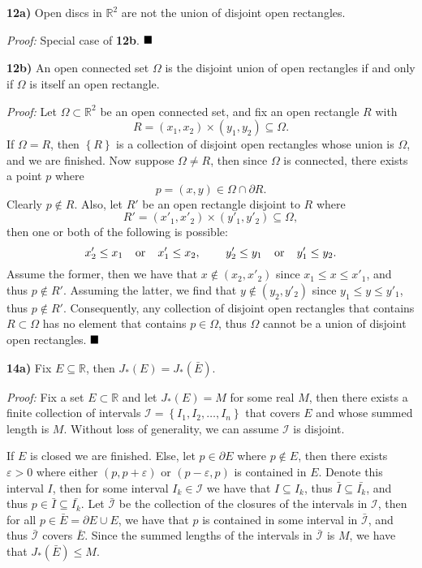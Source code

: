 \documentclass[12pt]{article}
\newcommand{\R}{\ensuremath{\mathbb{R}}}
\newcommand{\e}{\varepsilon}
\newcommand{\braceb}  [1]{\ensuremath{\left\{#1\right\}}}
\newcommand{\mc}[1]{\ensuremath{\mathcal{#1}}}
\newcommand{\done} {\ensuremath{\strut\hfill\blacksquare}}
\newcommand{\proof}{\textit{Proof: }}
\begin{document}
\textbf{12a)} Open discs in \( \R^2 \) are not the union of disjoint open
rectangles.

\proof Special case of \textbf{12b}.
\done

\textbf{12b)} An open connected set \( \Omega \) is the disjoint union of open
rectangles if and only if \( \Omega \) is itself an open rectangle.

\proof
Let \( \Omega \subset \R^2 \) be an open connected set, and fix an open
rectangle \( R \) with
\[
	R = (x_1, x_2) \times (y_1, y_2) \subseteq \Omega.
\]
If \( \Omega = R \), then \( \braceb{R} \) is a collection of disjoint
open rectangles whose union is \( \Omega \), and we are finished.
Now suppose \( \Omega \ne R \), then since \( \Omega \) is connected, there
exists a point \( p \) where
\[
	p = (x, y) \in \Omega \cap \partial R.
\]
Clearly \( p \notin R \).
Also, let \( R' \) be an open rectangle disjoint to \( R \) where 
\[
	R' = (x'_1, x'_2) \times (y'_1, y'_2) \subseteq \Omega,
\]
then one or both of the following is possible:
\[
	x'_2 \leq x_1
	\hspace{0.15in} \text{or} \hspace{0.15in}
	x'_1 \leq x_2,
	\hspace{0.3in}
	y'_2 \leq y_1
	\hspace{0.15in} \text{or} \hspace{0.15in}
	y'_1 \leq y_2.
\]
Assume the former, then we have that \( x \notin (x_2, x'_2) \) since
\( x_1 \leq x \leq x'_1 \), and thus \( p \notin R' \).
Assuming the latter, we find that \( y \notin (y_2, y'_2) \) since
\( y_1 \leq y \leq y'_1 \), thus \( p \notin R' \).
Consequently, any collection of disjoint open rectangles that contains
\( R \subset \Omega \) has no element that contains \( p \in \Omega \), thus
\( \Omega \) cannot be a union of disjoint open rectangles.
\done

\textbf{14a)} Fix \( E \subseteq \R \), then \( J_*(E) = J_*(\bar{E}) \).

\proof
Fix a set \( E \subset \R \) and let \( J_*(E) = M \) for some real
\( M \), then there exists a finite collection of intervals
\( \mc{I} = \braceb{I_1, I_2, \dots, I_n} \) that covers \( E \) and whose
summed length is \( M \).
Without loss of generality, we can assume \mc{I} is disjoint.

If \( E \) is closed we are finished.
Else, let \( p \in \partial E \) where \( p \notin E \), then there exists
\( \e > 0 \) where either \( (p, p + \e) \) or \( (p - \e, p) \) is contained
in \( E \).
Denote this interval \( I \), then for some interval \( I_k \in \mc{I} \) we
have that \( I \subseteq I_k \), thus
\( \bar{I} \subseteq \bar{I_k} \), and thus
\( p \in \bar{I} \subseteq \bar{I_k} \).
Let \( \bar{\mc{I}} \) be the collection of the closures of the intervals in
\mc{I}, then for all \( p \in \bar{E} = \partial E \cup E \), we have that
\( p \) is contained in some interval in \( \bar{\mc{I}} \), and thus
\( \bar{\mc{I}} \) covers \( \bar{E} \).
Since the summed lengths of the intervals in \( \bar{\mc{I}} \) is \( M \),
we have that \( J_*(\bar{E}) \leq M \).
\end{document}
